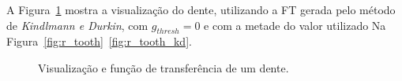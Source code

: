 	A Figura~\ref{fig:r_toothx_kd} mostra a visualização do dente, utilizando a FT gerada pelo método de \textit{Kindlmann e Durkin}, com $ g_{thresh} = 0 $ e com a metade do valor utilizado Na Figura~\ref{fig:r_tooth}~\ref{fig:r_tooth_kd}.

\begin{figure}[h]
	\centering
	\caption{Visualização e função de transferência de um dente.}
	\label{fig:r_toothx_kd}
\end{figure}

